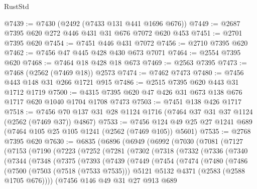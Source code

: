 \begin{lexlean}{RustStd}
\begin{coremodule}
@7439 := @7430 (@2492 (@7433 @131 @441 @1696 @676))
@7449 := @2687 @7395 @620 @272 @446 @431 @31 @676 @7072 @620 @453
@7451 := @2701 @7395 @620
@7454 := @7451 @446 @431 @7072
@7456 := @2710 @7395 @620
@7462 := @7456 @47 @445 @428 @430 @673 @7071
@7464 := @2554 @7395 @620
@7468 := @7464 @18 @428 @18 @673
@7469 := @2563 @7395
@7473 := @7468 (@2562 (@7469 @18)) @2573
@7474 := @7462 @7473
@7480 := @7456 @443 @148 @31 @266 @1721 @915
@7486 := @2515 @7395 @620 @443 @31 @1712 @1719
@7500 := @4315 @7395 @620 @47 @426 @31 @673 @138 @676 @1717 @620 @1040 @1704 @1708 @7473
@7503 := @7451 @138 @426 @1717
@7518 := @7456 @70 @137 @31 @28 @1124 @1716 (@7464 @37 @31 @37 @1124 (@2562 (@7469 @37)) @4867)
@7533 := @7456 @124 @49 @25 @27 @1241 @689 (@7464 @105 @25 @105 @1241 (@2562 (@7469 @105)) @5601)
@7535 := @2768 @7395 @620
@7630 := @6835
    (@6896
      (@6949
        (@6992
          (@7030
            (@7081
              (@7127
                (@7153
                  (@7190
                    (@7223
                      (@7252
                        (@7281
                          (@7302
                            (@7318
                              (@7332
                                (@7336
                                  (@7340
                                    (@7344
                                      (@7348
                                        (@7375
                                          (@7393
                                            (@7439
                                              (@7449
                                                (@7454
                                                  (@7474
                                                    (@7480
                                                      (@7486
                                                        (@7500
                                                          (@7503 (@7518 (@7533 @7535)))
                                                          @5121
                                                          @5132
                                                          @4371
                                                          (@2583 (@2588 @1705 @676))))
                                                      (@7456
                                                        @146
                                                        @49
                                                        @31
                                                        @27
                                                        @913
                                                        @689

\end{coremodule}
\end{lexlean}
